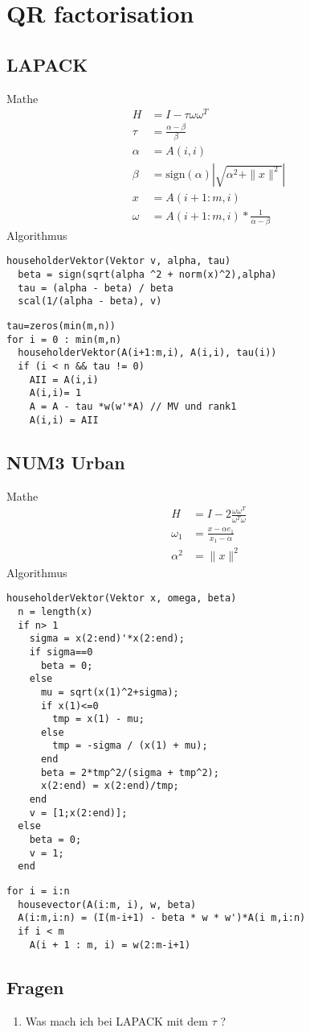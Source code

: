 \chapter{QR factorisation}

\section{LAPACK}
Mathe
\begin{align}
	H &= I - \tau \omega \omega^T \\
	\tau &= \frac{\alpha - \beta}{\beta} \\
	\alpha &= A(i,i)\\
	\beta &= \text{sign}(\alpha) \left|\sqrt{\alpha^2 + \|x\|^2}\right|\\
	x &= A(i+1:m,i)\\
	\omega &= A(i+1:m,i) * \frac{1}{\alpha - \beta}
\end{align}
Algorithmus
\begin{lstlisting}
householderVektor(Vektor v, alpha, tau)
  beta = sign(sqrt(alpha ^2 + norm(x)^2),alpha)
  tau = (alpha - beta) / beta	
  scal(1/(alpha - beta), v)
\end{lstlisting}
\begin{lstlisting}
tau=zeros(min(m,n))
for i = 0 : min(m,n)
  householderVektor(A(i+1:m,i), A(i,i), tau(i)) 
  if (i < n && tau != 0)
    AII = A(i,i)
    A(i,i)= 1
    A = A - tau *w(w'*A) // MV und rank1
    A(i,i) = AII
\end{lstlisting}

\section{NUM3 Urban}
Mathe
\begin{align}
	H &= I - 2 \frac{\omega \omega^T}{\omega^T \omega}\\
	\omega_1 &= \frac{x - \alpha e_1}{x_1 - \alpha}\\
	\alpha ^2 &= \|x\|^2 
\end{align}
Algorithmus
\begin{lstlisting}
householderVektor(Vektor x, omega, beta)
  n = length(x)
  if n> 1
    sigma = x(2:end)'*x(2:end);
    if sigma==0
      beta = 0;
    else
      mu = sqrt(x(1)^2+sigma);
      if x(1)<=0
        tmp = x(1) - mu;
      else
        tmp = -sigma / (x(1) + mu);
      end
      beta = 2*tmp^2/(sigma + tmp^2);
      x(2:end) = x(2:end)/tmp;
    end
    v = [1;x(2:end)];
  else
    beta = 0;
    v = 1;
  end
\end{lstlisting}

\begin{lstlisting}
for i = i:n
  housevector(A(i:m, i), w, beta)
  A(i:m,i:n) = (I(m-i+1) - beta * w * w')*A(i m,i:n)
  if i < m
    A(i + 1 : m, i) = w(2:m-i+1)
\end{lstlisting}



\section{Fragen}
\begin{enumerate}
	\item Was mach ich bei LAPACK mit dem $ \tau $ ?
\end{enumerate}
